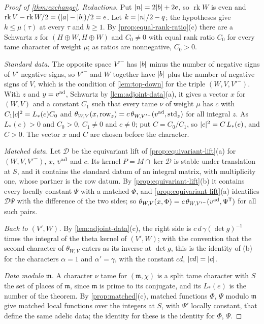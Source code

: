 \begin{proof}[Proof of \cref{thm:exchange}]
\emph{Reductions.} Put $\lvert n\rvert=2\lvert b\rvert+2e$, so $\operatorname{rk}W$ is even and $\operatorname{rk}V-\operatorname{rk}W/2=(\lvert a\rvert-\lvert b\rvert)/2=e$. Let $k=\lvert n\rvert/2-q$; the hypotheses give $k\le\mu(\tau)$ at every $\tau$
and $k\ge1$. By \cref{prop:equal-rank-ratio}(c) there are a Schwartz $z$ for $(H\oplus W,H\oplus W)$ and $C_0\ne0$ with equal rank ratio $C_0$ for every tame character of weight $\mu$; as ratios are nonnegative,
$C_0>0$.

\emph{Standard data.} The opposite space $V'^-$ has $\lvert b\rvert$ minus the number of negative signs of $V'$ negative signs, so $V'^-$ and $W$ together have $\lvert b\rvert$ plus the number of negative signs of $V$, which is the
condition of \cref{lem:top-down} for the triple $(W,V,V'^-)$. With $z$ and $y=v^{\rm ad}$, Schwartz by \cref{lem:adjoint-data}(a), it gives a vector $x$ for $(W,V)$ and a constant $C_1$ such that every tame $\nu$ of
weight $\mu$ has $c$ with $C_1\lvert c\rvert^2=L_*(e)C_0$ and $\theta_{W,V}(x,\mathrm{row}_z)=c\,\theta_{W,V'^-}(v^{\rm ad},\mathrm{std}_z)$ for all integral $z$. As $L_*(e)>0$ and $C_0>0$, $C_1\ne0$ and $c\ne0$; put
$C=C_0/C_1$, so $\lvert c\rvert^2=C\,L_*(e)$, and $C>0$. The vector $x$ and $C$ are chosen before the character.

\emph{Matched data.} Let $\mathcal D$ be the equivariant lift of \cref{prop:equivariant-lift}(a) for $(W,V,V'^-)$, $x$, $v^{\rm ad}$ and $c$. Its kernel $P=M\cap\ker\mathcal D$ is stable under translation at $S$, and
it contains the standard datum of an integral matrix, with multiplicity one, whose partner is the row datum. By \cref{prop:equivariant-lift}(b) it contains every locally constant $\Psi$ with a matched $\Phi$, and
\cref{prop:equivariant-lift}(a) identifies $\mathcal D\Psi$ with the difference of the two sides; so $\theta_{W,V}(x,\Phi)=c\,\theta_{W,V'^-}(v^{\rm ad},\Psi^{\mathsf T})$ for all such pairs.

\emph{Back to $(V',W)$.} By \cref{lem:adjoint-data}(c), the right side is $c\,d\,\gamma(\det g)^{-1}$ times the integral of the theta kernel of $(V',W)$; with the convention that the second character of
$\theta_{W,V}$ enters as its inverse at $\det g$, this is the identity of (b) for the characters $\alpha=1$ and $\alpha'=\gamma$, with the constant $cd$, $\lvert cd\rvert=\lvert c\rvert$.

\emph{Data modulo $\mathfrak m$.} A character $\nu$ tame for $(\mathfrak m,\chi)$ is a split tame character with $S$ the set of places of $\mathfrak m$, since $\mathfrak m$ is prime to its conjugate, and its $L_*(e)$ is the
number of the theorem. By \cref{prop:matched}(c), matched functions $\Phi$, $\Psi$ modulo $\mathfrak m$ give matched local functions over the integers at $S$, with $\Psi'$ locally constant, that define the same
adelic data; the identity for these is the identity for $\Phi$, $\Psi$.


\end{proof}
